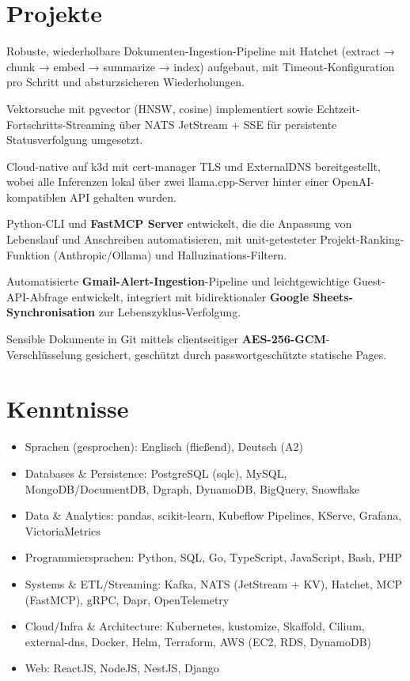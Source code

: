 \documentclass[10pt,a4paper]{resume}
\begin{document}
\section{Projekte}

\bullets
  \item Robuste, wiederholbare Dokumenten-Ingestion-Pipeline mit Hatchet (extract → chunk → embed → summarize → index) aufgebaut, mit Timeout-Konfiguration pro Schritt und absturzsicheren Wiederholungen.
  \item Vektorsuche mit pgvector (HNSW, cosine) implementiert sowie Echtzeit-Fortschritts-Streaming über NATS JetStream + SSE für persistente Statusverfolgung umgesetzt.
  \item Cloud-native auf k3d mit cert-manager TLS und ExternalDNS bereitgestellt, wobei alle Inferenzen lokal über zwei llama.cpp-Server hinter einer OpenAI-kompatiblen API gehalten wurden.
\bulletsend
\vspace{1.0pt}
\bullets
  \item Python-CLI und \textbf{FastMCP Server} entwickelt, die die Anpassung von Lebenslauf und Anschreiben automatisieren, mit unit-getesteter Projekt-Ranking-Funktion (Anthropic/Ollama) und Halluzinations-Filtern.
  \item Automatisierte \textbf{Gmail-Alert-Ingestion}-Pipeline und leichtgewichtige Guest-API-Abfrage entwickelt, integriert mit bidirektionaler \textbf{Google Sheets-Synchronisation} zur Lebenszyklus-Verfolgung.
  \item Sensible Dokumente in Git mittels clientseitiger \textbf{AES-256-GCM}-Verschlüsselung gesichert, geschützt durch passwortgeschützte statische Pages.
\bulletsend

\section{Kenntnisse}

\begin{itemize}[leftmargin=1.4em,nosep,topsep=2pt]
  \item Sprachen (gesprochen): Englisch (fließend), Deutsch (A2)
  \item Databases \& Persistence: PostgreSQL (sqlc), MySQL, MongoDB/DocumentDB, Dgraph, DynamoDB, BigQuery, Snowflake
  \item Data \& Analytics: pandas, scikit-learn, Kubeflow Pipelines, KServe, Grafana, VictoriaMetrics
  \item Programmiersprachen: Python, SQL, Go, TypeScript, JavaScript, Bash, PHP
  \item Systems \& ETL/Streaming: Kafka, NATS (JetStream + KV), Hatchet, MCP (FastMCP), gRPC, Dapr, OpenTelemetry
  \item Cloud/Infra \& Architecture: Kubernetes, kustomize, Skaffold, Cilium, external-dns, Docker, Helm, Terraform, AWS (EC2, RDS, DynamoDB)
  \item Web: ReactJS, NodeJS, NestJS, Django
\end{itemize}
\end{document}
